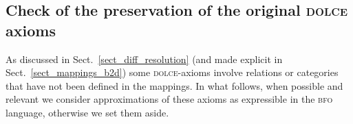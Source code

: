 \documentclass[ao]{iosart2x}
\newcommand{\bdDefLabel}{\textrm{d$_\texttt{bd}$}}
\newcommand{\refbddf}[1]{({\bdDefLabel}\ref{#1})}
\newcommand{\cn}[1]{\mathtt{#1}}
\newcommand{\dolce}{{\textsc{dolce}}}
\newcommand{\bfo}{{\textsc{bfo}}}
\newcommand {\EDdcat} {\textsc{ed}}
\newcommand {\NPEDdcat} {\textsc{nped}}
\newcommand {\PEDdcat} {\textsc{ped}}
\newcommand{\gdcntbcat}{\cn{gdcnt}}
\newcommand{\bfoiof}[1]{{\,::_{#1\:\!}}}
\begin{document}
%

\subsection{Check of the preservation of the original {\dolce} axioms}\label{sect_check_dolce_preservation}

As discussed in Sect.~\ref{sect_diff_resolution} (and made explicit in Sect.~\ref{sect_mappings_b2d}) some {\dolce}-axioms involve relations or categories that have not been defined in the mappings. In what follows, when possible and relevant we consider approximations of these axioms as expressible in the {\bfo} language, otherwise we set them aside.
\end{document}
